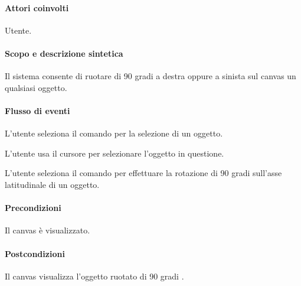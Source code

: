 \paragraph{Attori coinvolti} Utente.
\paragraph{Scopo e descrizione sintetica} Il sistema consente di ruotare di 90 gradi a destra oppure a sinista sul canvas un qualsiasi oggetto.
\paragraph{Flusso di eventi}
\begin{elenconumerato}[\textbf{}]{\subsubsecindent}
\item  L'utente seleziona il comando per la selezione di un oggetto.
\item  L'utente usa il cursore per selezionare l'oggetto in questione.
\item  L'utente seleziona il comando per effettuare la rotazione di 90 gradi sull'asse latitudinale di un oggetto.
\end{elenconumerato}
\paragraph{Precondizioni} Il canvas \`e visualizzato. 
\paragraph{Postcondizioni} Il canvas visualizza l'oggetto ruotato di 90 gradi .

